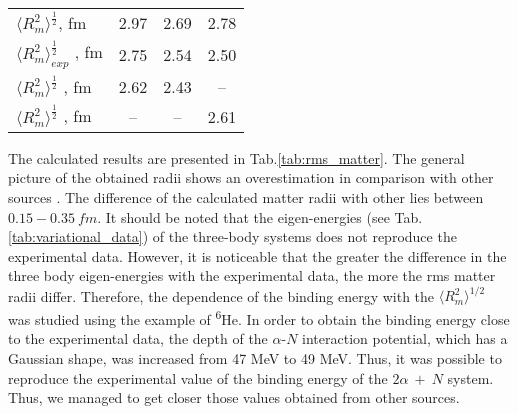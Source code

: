 \documentclass[
12pt, %
oneside, %
english, %
onehalfspacing, %
onehalfspacing, %
headsepline, %
]{MastersDoctoralThesis} %
\newcommand{\he}{\textsuperscript{6}He\xspace}
\begin{document}
\begin{table}[bp]
\begin{tabular*}{\textwidth}{@{\extracolsep{\fill}}lccc@{}}
\midrule
$\langle R^{2}_m\rangle^{\frac{1}{2}}$, fm & 2.97                                                                                                                                                                                              & 2.69                                                                                                                                                                                                                                                                                                     & 2.78                                                                                                                                                                                                                                                                                                     \\
$\langle R^{2}_m\rangle^{\frac{1}{2}}_{exp}$ , fm \cite{tanihata1985measurements}                                                                                                                                                                              & 2.75  & 2.54 & 2.50 \\

$\langle R^{2}_m\rangle^{\frac{1}{2}}$ , fm \cite{antonov2005charge}                                                                                                                                                                              & 2.62  & 2.43 & -- \\
$\langle R^{2}_m\rangle^{\frac{1}{2}}$ , fm \cite{hirai2011clustering}                                                                                                                                                                              & --  & -- & 2.61 \\
  \bottomrule
\end{tabular*}
\end{table}

The calculated results are presented in Tab.\ref{tab:rms_matter}. 
The general picture of the obtained radii shows an overestimation in comparison with other sources \cite{antonov2005charge, hirai2011clustering, tanihata1985measurements}. 
The difference of the calculated matter radii with other lies between $0.15-0.35~fm$. 
It should be noted that the eigen-energies (see Tab. \ref{tab:variational_data}) of the three-body systems does not reproduce the experimental data. 
However, it is noticeable that the greater the difference in the three body eigen-energies with the experimental data, the more the rms matter radii differ.
Therefore, the dependence of the binding energy with the $\langle R_{m}^2 \rangle^{1/2}$ was studied using the example of \he. In order to obtain the binding energy close to the experimental data, the depth of the $\alpha$-$N$ interaction potential, which has a Gaussian shape, was increased from 47 MeV to 49 MeV. Thus, it was possible to reproduce the experimental value of the binding energy of the $2\alpha~+~N$ system. Thus, we managed to get closer those values obtained from other sources.
\end{document}
